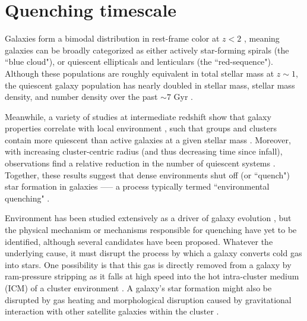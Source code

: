 \chapter{Quenching timescale}\label{chap-3}
    
Galaxies form a bimodal distribution in rest-frame color at $z < 2$ \citep{Strateva:2001aa,Baldry:2004aa,Bell:2004aa,Williams:2009tt}, meaning galaxies can be broadly categorized as either actively star-forming spirals (the ``blue cloud"), or quiescent ellipticals and lenticulars (the ``red-sequence").
Although these populations are roughly equivalent in total stellar mass at $z\sim1$, the quiescent galaxy population has nearly doubled in stellar mass, stellar mass density, and number density over the past $\sim7$ Gyr \citep{Arnouts:2007aa,Bell:2004aa,Borch:2006aa,Bundy:2006aa,Brown:2007aa,Faber:2007aa}.

Meanwhile, a variety of studies at intermediate redshift show that galaxy properties correlate with local environment \citep{Cooper:2006aa,Cooper:2007aa,Quadri:2007aa,Patel:2009aa}, such that groups and clusters contain more quiescent than active galaxies at a given stellar mass \citep{George:2011aa,Muzzin:2012dw,Presotto:2012aa,Tanaka:2012aa,Nantais:2017aa}.
Moreover, with increasing cluster-centric radius (and thus decreasing time since infall), observations find a relative reduction in the number of quiescent systems \cite[e.g.][]{Presotto:2012aa}.
Together, these results suggest that dense environments shut off (or ``quench") star formation in galaxies —-- a process typically termed ``environmental quenching" \citep{Peng:2010aa}.

Environment has been studied extensively as a driver of galaxy evolution \citep[for a review see][]{Blanton:2009aa}, but the physical mechanism or mechanisms responsible for quenching have yet to be identified, although several candidates have been proposed.
Whatever the underlying cause, it must disrupt the process by which a galaxy converts cold gas into stars.
One possibility is that this gas is directly removed from a galaxy by ram-pressure stripping as it falls at high speed into the hot intra-cluster medium (ICM) of a cluster environment \citep{Gunn:1972aa}.
A galaxy's star formation might also be disrupted by gas heating and morphological disruption caused by gravitational interaction with other satellite galaxies within the cluster \citep[``harassment", see][]{Moore:1996aa}.

